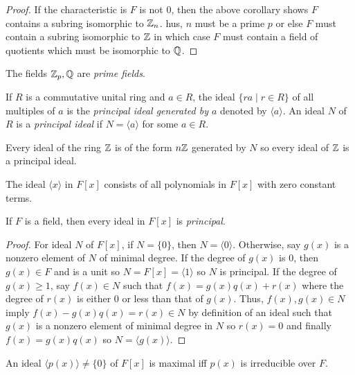 \begin{proof}
    If the characteristic is $F$ is not 0, then the above corollary shows $F$ contains a subring isomorphic to $\mathbb{Z}_n$. hus, $n$ must be a prime $p$ or else $F$ must contain a subring isomorphic to $\mathbb{Z}$ in which case $F$ must contain a field of quotients which must be isomorphic to $\mathbb{Q}$.
\end{proof}
\begin{definition}
    The fields $\mathbb{Z}_p, \mathbb{Q}$ are \emph{prime fields}.
\end{definition}
\begin{definition}
    If $R$ is a commutative unital ring and $a \in R$, the ideal $\{ra \mid r \in R\}$ of all multiples of $a$ is the \emph{principal ideal generated by $a$} denoted by $\langle a \rangle.$ An ideal $N$ of $R$ is a \emph{principal ideal} if $N = \langle a \rangle$ for some $a \in R$. 
\end{definition}
\begin{example}
    Every ideal of the ring $\mathbb{Z}$ is of the form $n\mathbb{Z}$ generated by $N$ so every ideal of $\mathbb{Z}$ is a principal ideal.
\end{example}
\begin{example}
    The ideal $\langle x \rangle$ in $F[x]$ consists of all polynomials in $F[x]$ with zero constant terms.
\end{example}
\begin{theorem}
    If $F$ is a field, then every ideal in $F[x]$ is \emph{principal}.
\end{theorem}
\begin{proof}
    For ideal $N$ of $F[x]$, if $N = \{0\}$, then $N = \langle 0 \rangle$. Otherwise, say $g(x)$ is a nonzero element of $N$ of minimal degree. If the degree of $g(x)$ is 0, then $g(x) \in F$ and is a unit so $N = F[x] = \langle 1 \rangle$ so $N$ is principal. If the degree of $g(x) \geq 1$, say $f(x) \in N$ such that $f(x) = g(x)q(x) + r(x)$ where the degree of $r(x)$ is either 0 or less than that of $g(x)$. Thus, $f(x), g(x) \in N$ imply $f(x) - g(x)q(x) = r(x) \in N$ by definition of an ideal such that $g(x)$ is a nonzero element of minimal degree in $N$ so $r(x) = 0$ and finally $f(x) = g(x)q(x)$ so $N=\langle g(x)\rangle.$
\end{proof}
\begin{theorem}
    An ideal $\langle p(x) \rangle \neq \{0\}$ of $F[x]$ is maximal iff $p(x)$ is irreducible over $F.$
\end{theorem}
